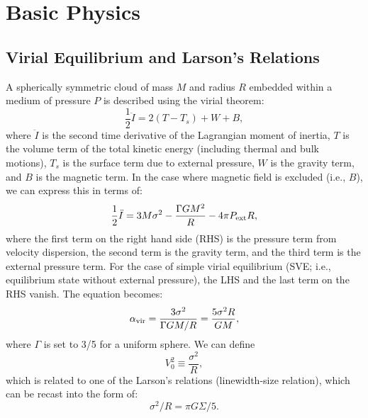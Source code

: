 \IfFileExists{emulateapjlegacy.cls}{\documentclass[iop]{emulateapjlegacy}}{\documentclass[iop]{emulateapj}}
\newcommand{\AP}[1]{({\bf \color{apcolor} AP: #1})}
\begin{document}
\section{Basic Physics} \label{sec:eqn}
\subsection{Virial Equilibrium and Larson's Relations}  \label{sec:PVE}

A spherically symmetric cloud of mass $M$ and radius $R$ embedded within
a medium of pressure $P$ is described using the virial theorem:
\begin{equation}
\frac{1}{2}\ddot I = 2(T - T_s) + W + B,
\end{equation}
where $\ddot I$ is the second time derivative of the Lagrangian moment of inertia,
$T$ is the volume term of the total kinetic energy (including thermal and
bulk motions), $T_s$ is the surface term due to external pressure,
$W$ is the gravity term, and $B$ is the magnetic term.
In the case where magnetic field is excluded (i.e., $B$), we can express this in terms of:
\begin{equation}
\frac{1}{2}\ddot I = 3 M \sigma^2 - \frac{\Gamma GM^2}{R} - 4\pi P_{\rm ext} R,
\label{eqn:virial}
\end{equation}
where the first term on the right hand side (RHS) is the pressure term from velocity dispersion, the second
term is the gravity term, and the third term is the external pressure term.
For the case of simple virial equilibrium (SVE; i.e., equilibrium state without external pressure),
the LHS and the last term on the RHS vanish. The equation becomes:
\begin{equation}
\alpha_{\rm vir} = \frac{3\sigma^2}{\Gamma GM/R} = \frac{5\sigma^2R}{GM},
\label{eqn:alpha}
\end{equation}
where $\Gamma$ is set to 3/5 for a uniform sphere.
We can define
\begin{equation}
V_0^2\equiv\frac{\sigma^2}{R},
\end{equation}
which is related to one of the Larson's relations (linewidth-size relation),
which can be recast into the form of:
\begin{equation}
\sigma^2/R = \pi G \Sigma/5.
\end{equation}
\end{document}
